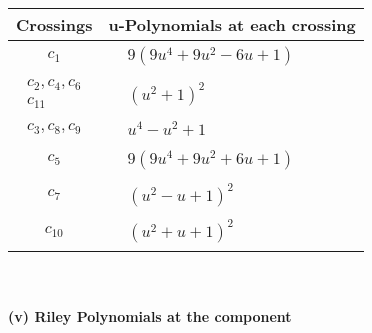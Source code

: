 \documentclass[1p]{elsarticle_modified}
\theoremstyle{definition}
\begin{document}
\begin{tabular}{m{50pt}|m{274pt}}
Crossings & \hspace{64pt}u-Polynomials at each crossing \\
\hline $$\begin{aligned}c_{1}\end{aligned}$$&$\begin{aligned}
&9(9 u^4+9 u^2-6 u+1)
\end{aligned}$\\
\hline $$\begin{aligned}c_{2},c_{4},c_{6}\\c_{11}\end{aligned}$$&$\begin{aligned}
&(u^2+1)^2
\end{aligned}$\\
\hline $$\begin{aligned}c_{3},c_{8},c_{9}\end{aligned}$$&$\begin{aligned}
&u^4- u^2+1
\end{aligned}$\\
\hline $$\begin{aligned}c_{5}\end{aligned}$$&$\begin{aligned}
&9(9 u^4+9 u^2+6 u+1)
\end{aligned}$\\
\hline $$\begin{aligned}c_{7}\end{aligned}$$&$\begin{aligned}
&(u^2- u+1)^2
\end{aligned}$\\
\hline $$\begin{aligned}c_{10}\end{aligned}$$&$\begin{aligned}
&(u^2+u+1)^2
\end{aligned}$\\
\hline
\end{tabular}\\~\\
\newpage\renewcommand{\arraystretch}{1}
\flushleft \textbf{(v) Riley Polynomials at the component}\newline \\
\end{document}
